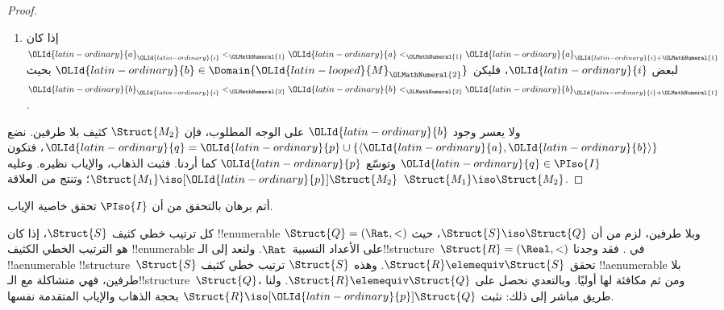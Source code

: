 \documentclass[../../../include/open-logic-section]{subfiles}
\begin{document}
\begin{proof}
\begin{enumerate}
 \item إذا كان ${\OLId{latin-ordinary}{a}}_{\OLId{latin-ordinary}{i}} <_{\OLMathNumeral{1}} {\OLId{latin-ordinary}{a}} <_{\OLMathNumeral{1}} {\OLId{latin-ordinary}{a}}_{{\OLId{latin-ordinary}{i}}+{\OLMathNumeral{1}}}$ لبعض ${\OLId{latin-ordinary}{i}}$، فليكن
   ${\OLId{latin-ordinary}{b}} \in \Domain{{\OLId{latin-looped}{M}}_{\OLMathNumeral{2}}}$ بحيث ${\OLId{latin-ordinary}{b}}_{\OLId{latin-ordinary}{i}} <_{\OLMathNumeral{2}} {\OLId{latin-ordinary}{b}} <_{\OLMathNumeral{2}} {\OLId{latin-ordinary}{b}}_{{\OLId{latin-ordinary}{i}}+{\OLMathNumeral{1}}}$.
  \end{enumerate}
  ولا يعسر وجود ${\OLId{latin-ordinary}{b}}$ على الوجه المطلوب، فإن $\Struct{M_2}$
  كثيف بلا طرفين. نضع ${\OLId{latin-ordinary}{q}} = {\OLId{latin-ordinary}{p}} \cup \{ \langle {\OLId{latin-ordinary}{a}}, {\OLId{latin-ordinary}{b}} \rangle \}$،
  فتكون ${\OLId{latin-ordinary}{q}} \in \PIso{I}$ وتوسّع ${\OLId{latin-ordinary}{p}}$ كما أردنا. فثبت الذهاب،
  والإياب نظيره. وعليه $\Struct{M_1} \iso[{\OLId{latin-ordinary}{p}}] \Struct{M_2}$؛
  وتنتج من  العلاقة
  $\Struct{M_1} \iso \Struct{M_2}$.
\end{proof}

\begin{prob}
  أتم برهان  بالتحقق من أن
  $\PIso{I}$ تحقق خاصية الإياب.
\end{prob}

\begin{rem}
  كل ترتيب خطي كثيف $\Struct{S}$، إذا كان !!{enumerable} وبلا
  طرفين، لزم من  أن $\Struct{S} \iso \Struct{Q}$،
  حيث $\Struct{Q} = (\Rat, <)$ هو الترتيب الخطي الكثيف
  !!{enumerable} على الأعداد النسبية~$\Rat$. ولنعد إلى
  الـ!!{structure}~$\Struct{R} = (\Real, <)$ في
  . فقد وجدنا !!a{enumerable}
  !!{structure}~$\Struct{S}$ تحقق $\Struct{R} \elemequiv \Struct{S}$.
  وهذه $\Struct{S}$ ترتيب خطي كثيف !!a{enumerable} بلا طرفين،
  فهي متشاكلة مع الـ!!{structure}~$\Struct{Q}$، ومن ثم مكافئة
  لها أوليًا. وبالتعدي نحصل على $\Struct{R} \elemequiv \Struct{Q}$.
  ولنا طريق مباشر إلى ذلك: نثبت $\Struct{R} \iso[{\OLId{latin-ordinary}{p}}] \Struct{Q}$
  بحجة الذهاب والإياب المتقدمة نفسها.
\end{rem}
\end{document}
